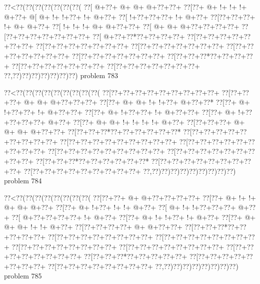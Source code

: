 \vbox{\vbox{\goo
\0??<\0??(\0??(\0??(\0??(\0??(\0??(\0??(
\0??[\- @+\0??+\- @+\- @+\- @+\0??+\0??+
\0??[\0??+\- @+\- !+\- !+\- !+\- @+\0??+
\- @[\- @+\- !+\- !+\0??+\- !+\- @+\0??+
\0??[\- !+\0??+\0??+\0??+\- !+\- @+\0??+
\0??[\0??+\0??+\0??+\- !+\- @+\- @+\0??+
\0??[\- !+\- !+\- !+\- @+\- @+\0??+\0??+
\0??[\- @+\- @+\- @+\0??+\0??+\0??+\0??+
\0??[\0??+\0??+\0??+\0??+\0??+\0??+\0??+
\0??[\- @+\0??+\0??*\0??+\0??+\0??+\0??+
\0??[\0??+\0??+\0??+\0??+\0??+\0??+\0??+
\0??[\0??+\0??+\0??+\0??+\0??+\0??+\0??+
\0??[\0??+\0??+\0??+\0??+\0??+\0??+\0??+
\0??[\0??+\0??+\0??+\0??+\0??+\0??+\0??+
\0??[\0??+\0??+\0??+\0??+\0??+\0??+\0??+
\0??[\0??+\0??+\0??*\0??+\0??+\0??+\0??+
\0??[\0??+\0??+\0??+\0??+\0??+\0??+\0??+
\0??[\0??+\0??+\0??+\0??+\0??+\0??+\0??+
\0??,\0??)\0??)\0??)\0??)\0??)\0??)\0??)
}
\hfil problem 783\hfil\break
}

\vbox{\vbox{\goo
\0??<\0??(\0??(\0??(\0??(\0??(\0??(\0??(\0??(\0??(
\0??[\0??+\0??+\0??+\0??+\0??+\0??+\0??+\0??+\0??+
\0??[\0??+\0??+\0??+\- @+\- @+\- @+\0??+\0??+\0??+
\0??[\0??+\- @+\- @+\- !+\- !+\0??+\- @+\0??+\0??*
\0??[\0??+\- @+\- !+\0??+\0??+\- !+\- @+\0??+\0??+
\0??[\0??+\- @+\- !+\0??+\0??+\- !+\- @+\0??+\0??+
\0??[\0??+\- @+\- !+\0??+\0??+\0??+\0??+\- @+\0??+
\0??[\0??+\- @+\- @+\- !+\- !+\- !+\- !+\- @+\0??+
\0??[\0??+\0??+\0??+\- @+\- @+\- @+\- @+\0??+\0??+
\0??[\0??+\0??+\0??*\0??+\0??+\0??+\0??+\0??+\0??*
\0??[\0??+\0??+\0??+\0??+\0??+\0??+\0??+\0??+\0??+
\0??[\0??+\0??+\0??+\0??+\0??+\0??+\0??+\0??+\0??+
\0??[\0??+\0??+\0??+\0??+\0??+\0??+\0??+\0??+\0??+
\0??[\0??+\0??+\0??+\0??+\0??+\0??+\0??+\0??+\0??+
\0??[\0??+\0??+\0??+\0??+\0??+\0??+\0??+\0??+\0??+
\0??[\0??+\0??+\0??*\0??+\0??+\0??+\0??+\0??+\0??*
\0??[\0??+\0??+\0??+\0??+\0??+\0??+\0??+\0??+\0??+
\0??[\0??+\0??+\0??+\0??+\0??+\0??+\0??+\0??+\0??+
\0??,\0??)\0??)\0??)\0??)\0??)\0??)\0??)\0??)\0??)
}
\hfil problem 784\hfil\break
}

\vbox{\vbox{\goo
\0??<\0??(\0??(\0??(\0??(\0??(\0??(\0??(\0??(
\0??[\0??+\0??+\- @+\- @+\0??+\0??+\0??+\0??+
\0??[\0??+\- @+\- !+\- !+\- @+\- @+\- @+\0??+
\0??[\0??+\- @+\- !+\0??+\- !+\- !+\- @+\0??+
\0??[\- @+\- !+\- !+\0??+\0??+\0??+\- @+\0??+
\0??[\- @+\0??+\0??+\0??+\0??+\- !+\- @+\0??+
\0??[\0??+\- @+\- !+\- !+\0??+\- !+\- @+\0??+
\0??[\0??+\- @+\- @+\- @+\- !+\- !+\- @+\0??+
\0??[\0??+\0??+\0??+\0??+\- @+\- @+\0??+\0??+
\0??[\0??+\0??+\0??*\0??+\0??+\0??+\0??+\0??+
\0??[\0??+\0??+\0??+\0??+\0??+\0??+\0??+\0??+
\0??[\0??+\0??+\0??+\0??+\0??+\0??+\0??+\0??+
\0??[\0??+\0??+\0??+\0??+\0??+\0??+\0??+\0??+
\0??[\0??+\0??+\0??+\0??+\0??+\0??+\0??+\0??+
\0??[\0??+\0??+\0??+\0??+\0??+\0??+\0??+\0??+
\0??[\0??+\0??+\0??*\0??+\0??+\0??+\0??+\0??+
\0??[\0??+\0??+\0??+\0??+\0??+\0??+\0??+\0??+
\0??[\0??+\0??+\0??+\0??+\0??+\0??+\0??+\0??+
\0??,\0??)\0??)\0??)\0??)\0??)\0??)\0??)\0??)
}
\hfil problem 785\hfil\break
}

